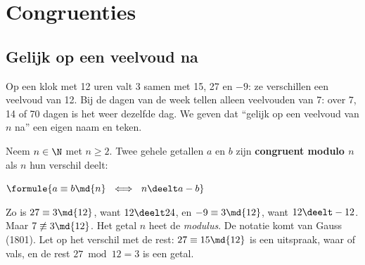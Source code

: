 \begin{oefeningen}[Start]

\end{oefeningen}


\section{Congruenties}

\subsection{Gelijk op een veelvoud na}

Op een klok met 12 uren valt 3 samen met 15, 27 en $-9$: ze verschillen een veelvoud van 12. Bij de dagen van de week tellen alleen veelvouden van 7: over 7, 14 of 70 dagen is het weer dezelfde dag. We geven dat ``gelijk op een veelvoud van $n$ na'' een eigen naam en teken.

\begin{theorie}
Neem $n \in \N$ met $n \geqslant 2$. Twee gehele getallen $a$ en $b$ zijn \textbf{\textcolor{accent}{congruent modulo $n$}} als $n$ hun verschil deelt:

\vspace{1mm}
\qquad $\formule{a \equiv b \md{n} \ \iff \ n \deelt a - b}$
\end{theorie}

Zo is $27 \equiv 3 \md{12}$, want $12 \deelt 24$, en $-9 \equiv 3 \md{12}$, want $12 \deelt -12$. Maar $7 \not\equiv 3 \md{12}$. Het getal $n$ heet de \emph{modulus}. De notatie komt van Gauss (1801). Let op het verschil met de rest: $27 \equiv 15 \md{12}$ is een uitspraak, waar of vals, en de rest $27 \bmod 12 = 3$ is een getal.


